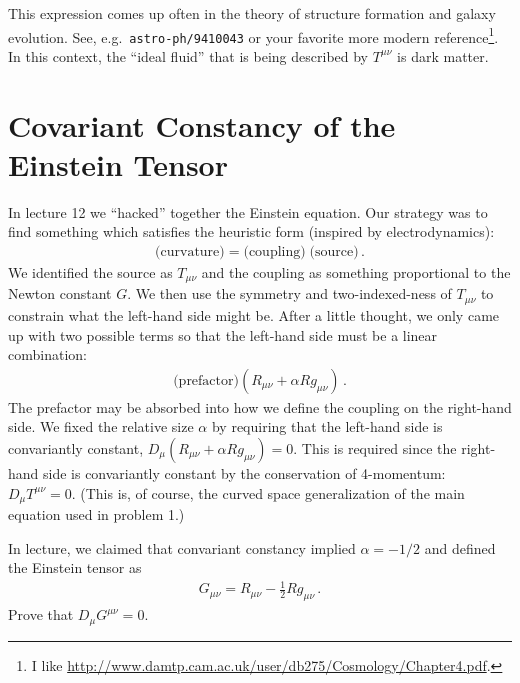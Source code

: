 \documentclass[12pt]{article}
\numberwithin{equation}{section}    %
\begin{document}
This expression comes up often in the theory of structure formation and galaxy evolution. See, e.g.\ \texttt{astro-ph/9410043} or your favorite more modern reference\footnote{I like \url{http://www.damtp.cam.ac.uk/user/db275/Cosmology/Chapter4.pdf}.}. In this context, the ``ideal fluid'' that is being described by $T^{\mu\nu}$ is dark matter.

\section{Covariant Constancy of the Einstein Tensor}

In lecture 12 we ``hacked'' together the Einstein equation. Our strategy was to find something which satisfies the heuristic form (inspired by electrodynamics):
\begin{align}
	\text{(curvature)} = \text{(coupling)} \; \text{(source)} \, .
\end{align}
We identified the source as $T_{\mu\nu}$ and the coupling as something proportional to the Newton constant $G$. We then use the symmetry and two-indexed-ness of $T_{\mu\nu}$ to constrain what the left-hand side might be. After a little thought, we only came up with two possible terms so that the left-hand side must be a linear combination:
\begin{align}
	\text{(prefactor)} \left(R_{\mu\nu} + \alpha R g_{\mu\nu}\right) \, .
\end{align}
The prefactor may be absorbed into how we define the coupling on the right-hand side. We fixed the relative size $\alpha$ by requiring that the left-hand side is convariantly constant, $D_\mu \left(R_{\mu\nu} + \alpha R g_{\mu\nu}\right) =0$. This is required since the right-hand side is convariantly constant by the conservation of 4-momentum: $D_\mu T^{\mu\nu} = 0$. (This is, of course, the curved space generalization of the main equation used in problem 1.)

In lecture, we claimed that convariant constancy implied $\alpha = -1/2$ and defined the Einstein tensor as
\begin{align}
	G_{\mu\nu} = R_{\mu\nu} - \frac 12 R g_{\mu\nu} \, .
\end{align}
Prove that $D_\mu G^{\mu\nu} = 0$. 
\end{document}
